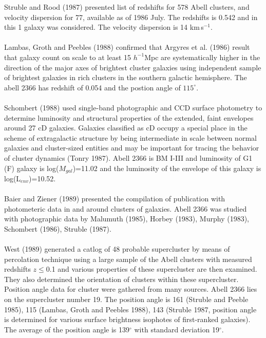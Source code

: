 Struble and Rood (1987) presented list of redshifts  for 578 Abell clusters, and velocity dispersion for 77, available as of 1986 July. The redshifts  is 0.542 and in this 1 galaxy was considered. The velocity dispersion is 14 km\,s$^{-1}$.\\\\
Lambas, Groth and Peebles (1988) confirmed that Argyres et al. (1986) result that galaxy count on scale to at least 15 $h^{-1}$Mpc are systematically higher in the direction of the major axes of brightest cluster galaxies using independent sample of brightest galaxies in rich clusters in the southern galactic hemisphere. The abell 2366 has redshift of 0.054 and the postion angle of $115^\circ$.\\\\
Schombert (1988) used single-band photographic and CCD surface photometry to determine luminosity and structural properties of the extended, faint envelopes around 27 cD galaxies. Galaxies classified as cD occupy a special place in the scheme of extragalactic structure by being intermediate in scale between normal galaxies and cluster-sized entities and may be important for tracing the behavior of cluster dynamics (Tonry 1987). Abell 2366 is BM I-III and luminosity of G1 (F) galaxy is log($M_{gal}$)=11.02 and the luminosity of the envelope of this galaxy is log(L$_{env}$)=10.52.\\\\
Baier and Ziener (1989)  presented the compilation of publication with photometeric data in and around clusters of galaxies. Abell 2366 was studied with photographic data by Malumuth (1985), Horbey (1983), Murphy (1983), Schombert (1986), Struble (1987).\\\\
West (1989) generated a catlog of 48 probable supercluster by means of percolation technique using a large sample of the Abell clusters with measured redshifts $z\leq$0.1 and various properties of these supercluster are then examined. They also determined the orientation of clusters within these supercluster. Position angle data for cluster were gathered from many sources. Abell 2366 lies on the supercluster number 19. The position angle is 161 (Struble and Peeble 1985), 115 (Lambas, Groth and Peebles 1988), 143 (Struble 1987, position angle is determined for various surface brightness isophotes of first-ranked galaxies). The average of the position angle is 139$^\circ$  with standard deviation 19$^\circ$.\\\\
